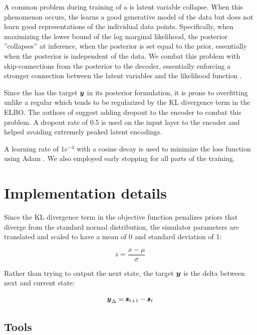 A common problem during training of a \vae{} is latent variable collapse. When this phenomenon occurs, the \vae{} learns a good generative model of the data but does not learn good representations of the individual data points. Specifically, when maximizing the lower bound of the log marginal likelihood, the posterior ''collapses'' at inference, when the posterior is set equal to the prior, essentially when the posterior is independent of the data. We combat this problem with skip-connections from the posterior to the decoder, essentially enforcing a stronger connection between the latent variables and the likelihood function \parencite{Dieng2018}.

Since the \cvae{} has the target $\boldsymbol{y}$ in its posterior formulation, it is prone to overfitting unlike a regular \vae{} which tends to be regularized by the KL divergence term in the ELBO. The authors of \parencite{Sohn2015} suggest adding dropout to the encoder to combat this problem. A dropout rate of $0.5$ is used on the input layer to the encoder and helped avoiding extremely peaked latent encodings.

A learning rate of $1e^{-4}$ with a cosine decay is used to minimize the loss function using Adam \parencite{kingma2014adam}. We also employed early stopping for all parts of the training.

\section{Implementation details}

Since the KL divergence term in the objective function penalizes priors that diverge from the standard normal distribution, the simulator parameters are translated and scaled to have a mean of 0 and standard deviation of 1:

\begin{equation*}
    z = \frac{x - \mu}{\sigma}
\end{equation*}

Rather than trying to output the next state, the target $\boldsymbol{y}$ is the delta between next and current state:

\begin{equation*}
    \boldsymbol{y}_{\Delta} = \pmb{s}_{t+1} - \pmb{s}_t
\end{equation*}

\subsection{Tools}

